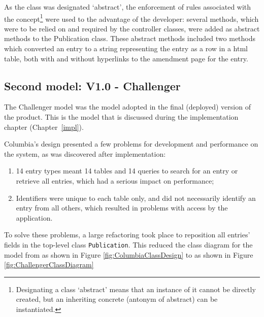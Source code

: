 As the class was designated `abstract', the enforcement of rules associated with the concept\footnote{Designating a class `abstract' means that an instance of it cannot be directly created, but an inheriting concrete (antonym of abstract) can be instantiated.} were used to the advantage of the developer: several methods, which were to be relied on and required by the controller classes, were added as abstract methods to the Publication class.  These abstract methods included two methods which converted an entry to a string representing the entry as a row in a \gls{html} table, both with and without hyperlinks to the amendment page for the entry.


\subsection{Second model: V1.0 - Challenger}
\label{designChallenger}
The Challenger model was the model adopted in the final (deployed) version of the product.  This is the model that is discussed during the implementation chapter (Chapter~\ref{impl}).

Columbia's design presented a few problems for development and performance on the system, as was discovered after implementation:
\begin{enumerate}
	\item 14 entry types meant 14 tables and 14 queries to search for an entry or retrieve all entries, which had a serious impact on performance;
	\item Identifiers were unique to each table only, and did not necessarily identify an entry from all others, which resulted in problems with access by the application.
\end{enumerate}

To solve these problems, a large refactoring took place to reposition all entries' fields in the top-level class \texttt{Publication}.  This reduced the class diagram for the model from as shown in Figure \ref{fig:ColumbiaClassDesign} to as shown in Figure \ref{fig:ChallengerClassDiagram}

